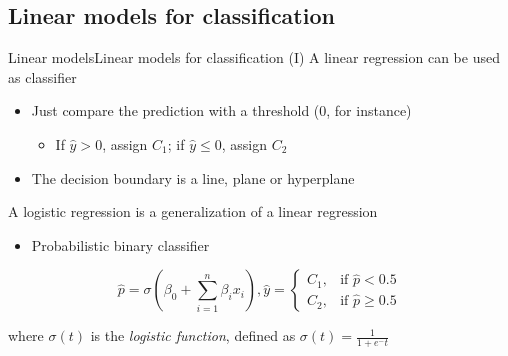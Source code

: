 \documentclass[10pt,compress]{beamer} %
\begin{document}
\subsection{Linear models for classification}

\begin{frame}{Linear models}{Linear models for classification (I)}
    A linear regression can be used as classifier
	\begin{itemize}
		\item Just compare the prediction with a threshold (0, for instance)
            \begin{itemize}
                \item If $\hat{y} > 0$, assign $C_1$; if $\hat{y} \le 0$, assign $C_2$
            \end{itemize}
        \item The decision boundary is a line, plane or hyperplane
	\end{itemize}

    A \alert{logistic regression} is a generalization of a linear regression
    \begin{itemize}
        \item Probabilistic binary classifier
    \end{itemize}

    \begin{fleqn}
    \begin{equation*}
        \hat{p} = \sigma\left(\beta_0+\sum_{i=1}^{n} \beta_i x_i\right),
        \hat{y} = \begin{cases}C_1, & \text{if } \hat{p} < 0.5 \\ C_2, & \text{if } \hat{p} \ge 0.5\end{cases} 
    \end{equation*}
    \end{fleqn}

    where $\sigma(t)$ is the \textit{logistic function}, defined as $\sigma(t) = \frac{1}{1 + e^-t}$

    \vspace{-3cm}
    \flushright
\end{frame}
\end{document}
